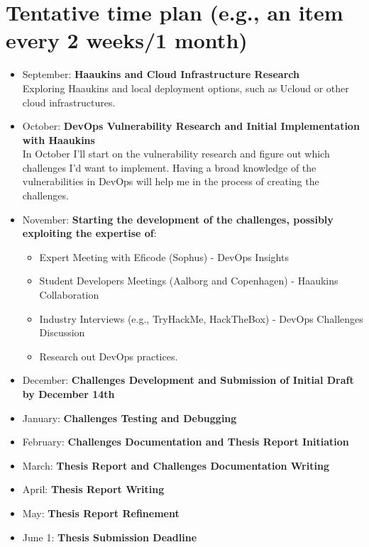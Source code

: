 \documentclass[a4, 12pt]{article}
\begin{document}
\section{Tentative time plan (e.g., an item every 2 weeks/1 month)}
\begin{itemize}
    \item September: \textbf{Haaukins and Cloud Infrastructure Research}\\
        Exploring Haaukins and local deployment options, such as Ucloud or other cloud infrastructures.
    \item October: \textbf{DevOps Vulnerability Research and Initial Implementation with Haaukins}\\
        In October I'll start on the vulnerability research and figure out which challenges I'd want to implement.
        Having a broad knowledge of the vulnerabilities in DevOps will help me in the process of creating the challenges.\cite{tryhackme}\cite{cicdgoat_github}\cite{ctftime_event}
    \item November: \textbf{Starting the development of the challenges, possibly exploiting the expertise of}:
        \begin{itemize}
            \item Expert Meeting with Eficode (Sophus)\cite{Sofus_Albertsen} - DevOps Insights
            \item Student Developers Meetings (Aalborg and Copenhagen) - Haaukins Collaboration \cite{haaukins_docs}\cite{haaukins_github}
            \item Industry Interviews (e.g., TryHackMe, HackTheBox) - DevOps Challenges Discussion
            \item Research out DevOps practices.
        \end{itemize}
    \item December: \textbf{Challenges Development and Submission of Initial Draft by December 14th}

    \item January: \textbf{Challenges Testing and Debugging}
    \item February: \textbf{Challenges Documentation and Thesis Report Initiation}
    \item March: \textbf{Thesis Report and Challenges Documentation Writing}
    \item April: \textbf{Thesis Report Writing} 
    \item May: \textbf{Thesis Report Refinement}
    \item June 1: \textbf{Thesis Submission Deadline}
\end{itemize}
\end{document}
